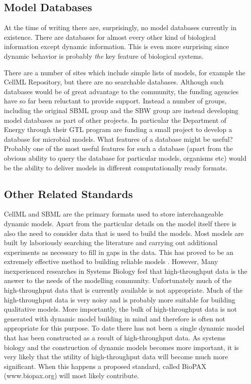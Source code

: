 \documentclass[12pt]{article}
\begin{document}
{\subsection {Model Databases}

At the time of writing there are, surprisingly, no model databases
currently in existence. There are databases for almost every other
kind of biological information except dynamic information. This is even
more surprising since dynamic behavior is probably {\em the} key feature
of biological systems.

There are a number of sites which include simple lists of models, for example the CellML Repository, but there are no searchable databases. Although such databases would
be of great advantage to the community, the funding agencies have
so far been reluctant to provide support. Instead a number of
groups, including the original SBML group and the SBW group are
instead developing model databases as part of other projects. In
particular the Department of Energy through their GTL program are
funding a small project to develop a database for microbial
models. What features of a database might be useful? Probably one
of the most useful features for such a database (apart from the
obvious ability to query the database for particular models, organisms etc)
would be the ability to deliver models in different computationally ready formats.

\subsection{Other Related Standards}

CellML and SBML are the primary formats used to store interchangeable dynamic models. Apart from the particular details on the model itself there is also the need to consider data that is used to build the models. Most models are built by laboriously searching the literature and carrying out additional experiments as necessary to fill in gaps in the data. This has proved to be an extremely effective method to building reliable models \cite{TysonNatReview2001,TysonBioessay2002}. However, Many inexperienced researches in Systems Biology feel that high-throughput data is the answer to the needs of the modelling community. Unfortunately much of the high-throughput data that is currently available is not appropriate. Much of the high-throughput data is very noisy and is probably more suitable for building qualitative models. More importantly, the bulk of high-throughput data is not generated with dynamic model building in mind and therefore is often not appropriate for this purpose. To date there has not been a single dynamic model that has been constructed as a result of high-throughput data. As systems biology and the construction of dynamic models becomes more important, it is very likely that the utility of high-throughput data will become much more significant. When this happens a proposed standard, called BioPAX (www.biopax.org) will most likely contribute.

}
\end{document}
